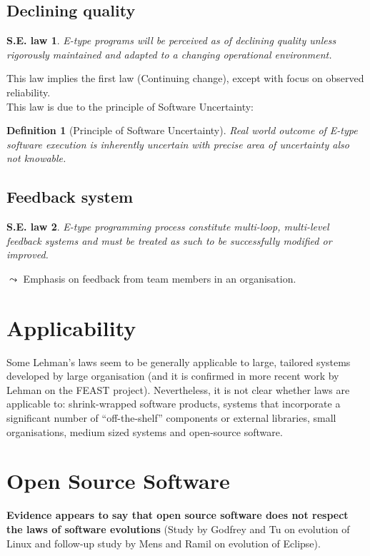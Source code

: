 \documentclass[a4paper,11pt]{report}
\newtheorem{definition}{Definition}
\newtheorem{law}{S.E. law}
\begin{document}
\subsection{Declining quality}
\begin{law}
E-type programs will be perceived as of declining quality unless rigorously
maintained and adapted to a changing operational environment.
\end{law}

This law implies the first law (Continuing change), except with focus on
observed reliability.\\

This law is due to the principle of Software Uncertainty:
\begin{definition}[Principle of Software Uncertainty]
Real world outcome of E-type software execution is inherently uncertain with
precise area of uncertainty also not knowable.
\end{definition}

\subsection{Feedback system}
\begin{law}
E-type programming process constitute multi-loop, multi-level feedback
systems and must be treated as such to be successfully modified or improved.
\end{law}

$\leadsto$ Emphasis on feedback from team members in an organisation.

\section{Applicability}
Some Lehman's laws seem to be generally applicable to large, tailored systems
developed by large organisation (and it is confirmed in more recent work by
Lehman on the FEAST project). Nevertheless, it is not clear whether laws are
applicable to: shrink-wrapped software products, systems that incorporate a
significant number of ``off-the-shelf'' components or external libraries, small
organisations, medium sized systems and open-source software.

\section{Open Source Software}
\textbf{Evidence appears to say that open source software does not respect the
laws of software evolutions} (Study by Godfrey and Tu on evolution of Linux and
follow-up study by Mens and Ramil on evolution of Eclipse).
\end{document}
